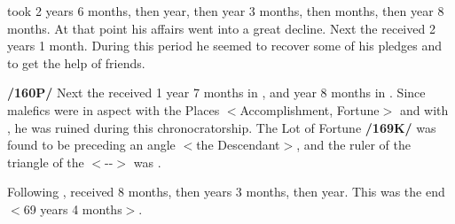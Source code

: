 \Aquarius\xspace took 2 years 6 months, then \Jupiter\xspace 1 year, then \Mars\xspace 1 year 3 months, then \Venus\xspace 8 months, then \Mercury\xspace 1 year 8 months. At that point his affairs went into a great decline. Next the \Moon\xspace received 2 years 1 month. During this period he seemed to recover some of his pledges and to get the help of friends. 

\textbf{/160P/} Next the \Sun\xspace received 1 year 7 months in \Leo, and \Mercury\xspace 1 year 8 months in \Virgo. Since malefics were in aspect with the Places $<$Accomplishment, Fortune$>$ and with \Mercury, he was ruined during this chronocratorship. The Lot of Fortune \textbf{/169K/} was found to be preceding an angle $<$the Descendant$>$, and the ruler of the triangle of the \Moon\xspace $<$\Cancer-\Pisces-\Scorpio$>$ was \Mars. 

Following \Mercury, \Venus\xspace received 8 months, then \Mars\xspace 1 years 3 months, then \Sagittarius\xspace 1 year. This was the end $<$69 years 4 months$>$.

\newpage